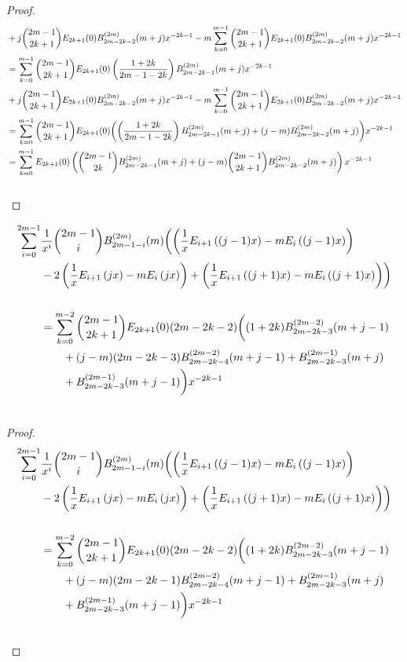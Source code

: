 \documentclass[fleqn,a4paper,9pt]{article}
\begin{document}
\begin{flushleft}
\begin{proof}
\begin{align}
&+j\binom{2m-1}{2k+1}E_{2k+1}(0)B_{2m-2k-2}^{(2m)}(m+j)x^{-2k-1}-m\sum_{k=0}^{m-1}\binom{2m-1}{2k+1}E_{2k+1}(0)B_{2m-2k-2}^{(2m)}(m+j)x^{-2k-1}\\\notag
&=\sum_{k=0}^{m-1}\binom{2m-1}{2k+1}E_{2k+1}(0)\left(\frac{1+2k}{2m-1-2k}\right)B_{2m-2k-1}^{(2m)}(m+j) x^{-2k-1}\\\notag
&+j\binom{2m-1}{2k+1}E_{2k+1}(0)B_{2m-2k-2}^{(2m)}(m+j)x^{-2k-1}-m\sum_{k=0}^{m-1}\binom{2m-1}{2k+1}E_{2k+1}(0)B_{2m-2k-2}^{(2m)}(m+j)x^{-2k-1}\\\notag
&=\sum_{k=0}^{m-1}\binom{2m-1}{2k+1}E_{2k+1}(0)\biggl(\left(\frac{1+2k}{2m-1-2k}\right)B_{2m-2k-1}^{(2m)}(m+j)+(j-m) B_{2m-2k-2}^{(2m)}(m+j)\biggr)x^{-2k-1}\\\notag
&=\sum_{k=0}^{m-1}E_{2k+1}(0)\left(\binom{2m-1}{2k}B_{2m-2k-1}^{(2m)}(m+j)+(j-m)\binom{2m-1}{2k+1}B_{2m-2k-2}^{(2m)}(m+j)\right)x^{-2k-1}\\\notag
\end{align}
\end{proof}
\begin{lemma}\label{middletermprep}
\begin{align}
\sum_{i=0}^{2m-1}&\frac{1}{x^i}\binom{2m-1}{i}B_{2m-1-i}^{(2m)}(m)\biggl(\left(\frac{1}{x}E_{i+1}\left((j-1)x\right)-m E_i\left((j-1)x\right)\right)\\\notag
&-2\left(\frac{1}{x}E_{i+1}\left(j x\right)-m E_i\left(j x\right)\right)+\left(\frac{1}{x}E_{i+1}\left((j+1)x\right)-m E_i\left((j+1)x\right)\right)\biggr)\\\notag\\\notag
&=\sum_{k=0}^{m-2}\binom{2m-1}{2k+1}E_{2k+1}(0)(2m-2k-2)\biggl((1+2k)B_{2m-2k-3}^{(2m-2)}(m+j-1)\\\notag
&\  \  \  \  \  \  +(j-m)(2m-2k-3)B_{2m-2k-4}^{(2m-2)}(m+j-1)+B_{2m-2k-3}^{(2m-1)}(m+j)\\\notag
&\  \  \  \  \  \  +B_{2m-2k-3}^{(2m-1)}(m+j-1)\biggr) x^{-2k-1}\\\notag
\end{align}
\end{lemma}
\begin{proof}
\begin{align}
\sum_{i=0}^{2m-1}&\frac{1}{x^i}\binom{2m-1}{i}B_{2m-1-i}^{(2m)}(m)\biggl(\left(\frac{1}{x}E_{i+1}\left((j-1)x\right)-m E_i\left((j-1)x\right)\right)\\\notag
&-2\left(\frac{1}{x}E_{i+1}\left(j x\right)-m E_i\left(j x\right)\right)+\left(\frac{1}{x}E_{i+1}\left((j+1)x\right)-m E_i\left((j+1)x\right)\right)\biggr)\\\notag\\\notag
&=\sum_{k=0}^{m-2}\binom{2m-1}{2k+1}E_{2k+1}(0)(2m-2k-2)\biggl((1+2k)B_{2m-2k-3}^{(2m-2)}(m+j-1)\\\notag
&\  \  \  \  \  \  +(j-m)(2m-2k-1)B_{2m-2k-4}^{(2m-2)}(m+j-1)+B_{2m-2k-3}^{(2m-1)}(m+j)\\\notag
&\  \  \  \  \  \  +B_{2m-2k-3}^{(2m-1)}(m+j-1)\biggr) x^{-2k-1}\\\notag
\end{align}


\end{proof}
\end{flushleft}
\end{document}
